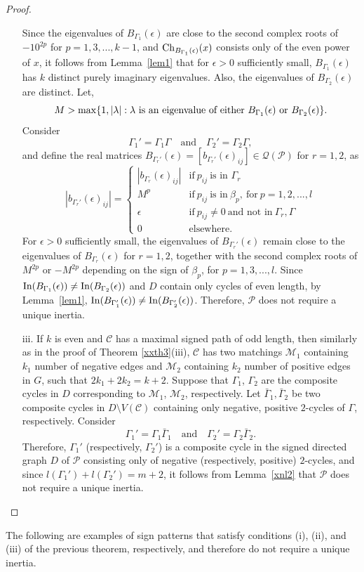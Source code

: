 \documentclass[a4paper, 10pt]{article}
\numberwithin{equation}{section}
\def\In{{\rm In}}
\def\Ch{{\rm Ch}}
\def\max{{\rm max}}
\begin{document}
\begin{proof}
\begin{itemize}
		Since the eigenvalues of $B_{\Gamma_1}(\epsilon)$ are close to the second complex roots of $-10^{2p}$ for $p=1,3,...,k-1$, and $\Ch_{B_{\Gamma_1}(\epsilon)}(x)$ consists only of the even power of $x$, it follows from Lemma~\ref{lem1} that for $\epsilon>0$ sufficiently small, $B_{\Gamma_1}(\epsilon)$ has $k$ distinct purely imaginary eigenvalues. Also, the eigenvalues of $B_{\Gamma_2}(\epsilon)$ are distinct.  Let,
		$$M>\max\{1,|\lambda|: \lambda~ \text{is an eigenvalue of either} ~B_{\Gamma_1}(\epsilon)~\text{or}~B_{\Gamma_2}(\epsilon)\}.$$ 
		Consider $$\Gamma_1'=\Gamma_1\Gamma \quad\text{and}\quad \Gamma_2'=\Gamma_2\Gamma,$$
		and define the real matrices $B_{\Gamma_r'}(\epsilon)=[b_{\Gamma_r'}(\epsilon)_{ij}]\in \mathcal{Q}(\mathcal{P})$ for $r=1,2$, as
		$$|b_{\Gamma_r'}(\epsilon)_{ij}|= \begin{cases}
			|b_{\Gamma_r}(\epsilon)_{ij}| & \text{if}\ p_{ij}~ \text{is in } \Gamma_r \\
			M^p & \text{if}\ p_{ij}~ \text{is in}~ \beta_p,~\text{for}~p=1,2,...,l \\
			\epsilon & \text{if}~ p_{ij}\neq 0~\text{and not in}~ \Gamma_r, \Gamma\\
			0 & \text{elsewhere.}
		\end{cases}$$
		For $\epsilon>0$ sufficiently small, the eigenvalues of $B_{\Gamma_r'}(\epsilon)$ remain close to the eigenvalues of $B_{\Gamma_r}(\epsilon)$  for $r=1,2$, together with the second complex roots of $M^{2p}$ or $-M^{2p}$ depending on the sign of $\beta_p$, for $p=1,3,...,l$. Since $\In(B_{\Gamma_1}(\epsilon))\neq \In(B_{\Gamma_2}(\epsilon))$ and $D$ contain only cycles of even length, by Lemma~\ref{lem1}, $\In(B_{\Gamma_1'}(\epsilon))\neq \In(B_{\Gamma_2'}(\epsilon))$. Therefore, $\mathcal{P}$ does not require a unique inertia.
		
		
		
		
		\item[iii.]  If $k$ is even and $\mathcal{C}$ has a maximal signed path of odd length, then similarly as in the proof of Theorem \ref{xxth3}(iii), $\mathcal{C}$ has two matchings $\mathcal{M}_1$ containing $k_1$ number of negative edges and $\mathcal{M}_2$ containing $k_2$ number of positive edges in $G$, such that $2k_1+2k_2=k+2$. Suppose that $\Gamma_1$, $\Gamma_2$ are the composite cycles in $D$ corresponding to $\mathcal{M}_1$, $\mathcal{M}_2$, respectively. Let $\bar{\Gamma}_1, \bar{\Gamma}_2$ be two composite cycles in $D\setminus V(\mathcal{C})$ containing only negative, positive $2$-cycles of $\Gamma$, respectively. Consider $$\Gamma_1'=\Gamma_1\bar{\Gamma}_1\quad\text{and}\quad\Gamma_2'=\Gamma_2\bar{\Gamma}_2.$$
		Therefore, $\Gamma_1'$ (respectively, $\Gamma_2'$) is a composite cycle in the signed directed graph $D$ of $\mathcal{P}$ consisting only of negative (respectively, positive) $2$-cycles, and since $l(\Gamma_1') + l(\Gamma_2') = m + 2$, it follows from Lemma~\ref{xnl2} that $\mathcal{P}$ does not require a unique inertia. 
	\end{itemize}
\end{proof}
The following are examples of sign patterns that satisfy conditions (i), (ii), and (iii) of the previous theorem, respectively, and therefore do not require a unique inertia.
\end{document}
